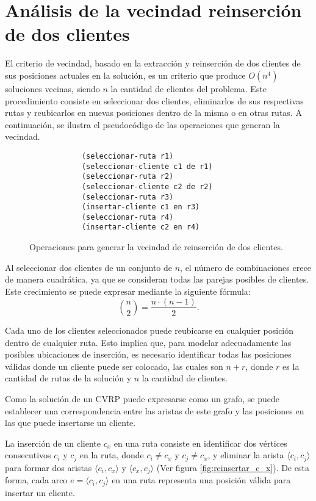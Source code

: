 \documentclass[12pt]{report}
\begin{document}
	\section{Análisis de la vecindad reinserción de dos clientes}
	\label{sec:Análisis de la vecindad reinserción de dos clientes}
	El criterio de vecindad, basado en la extracción y reinserción de dos clientes de sus posiciones actuales en la solución, es un criterio que produce $O(n^4)$ soluciones vecinas, siendo $n$ la cantidad de clientes del problema. Este procedimiento consiste en seleccionar dos clientes, eliminarlos de sus respectivas rutas y reubicarlos en nuevas posiciones dentro de la misma o en otras rutas. A continuación, se ilustra el pseudocódigo de las operaciones que generan la vecindad.
	\begin{figure}[h]
			\begin{verbatim}
			(seleccionar-ruta r1)
			(seleccionar-cliente c1 de r1)
			(seleccionar-ruta r2)
			(seleccionar-cliente c2 de r2)
			(seleccionar-ruta r3)
			(insertar-cliente c1 en r3)
			(seleccionar-ruta r4)
			(insertar-cliente c2 en r4)
		\end{verbatim}
		\caption{Operaciones para generar la vecindad de reinserción de dos clientes.}
		\label{fig:ejemplo_de_criterio}
	\end{figure}


	Al seleccionar dos clientes de un conjunto de $n$, el número de combinaciones crece de manera cuadrática, ya que se consideran todas las parejas posibles de clientes. Este crecimiento se puede expresar mediante la siguiente fórmula:
	\[
	\binom{n}{2} = \frac{n\cdot (n-1)}{2}\text{.}
	\]

	 Cada uno de los clientes seleccionados puede reubicarse en cualquier posición dentro de cualquier ruta. Esto implica que, para modelar adecuadamente las posibles ubicaciones de inserción, es necesario identificar todas las posiciones válidas donde un cliente puede ser colocado, las cuales son $n + r$, donde $r$ es la cantidad de rutas de la solución y $n$ la cantidad de clientes.

	Como la solución de un CVRP puede expresarse como un grafo, se puede establecer una correspondencia entre las aristas de este grafo y las posiciones en las que puede insertarse un cliente.


	La inserción de un cliente $c_x$ en una ruta consiste en identificar dos vértices consecutivos $c_i$ y $c_j$ en la ruta, donde $c_i \neq c_x$ y $c_j \neq c_x$, y eliminar la arista $\langle c_i,c_j \rangle$ para formar dos aristas $\langle c_i,c_x \rangle$ y $\langle c_x,c_j \rangle$ (Ver figura \ref{fig:reinsertar_c_x}). De esta forma, cada arco $e = \langle c_i,c_j \rangle$ en una ruta representa una posición válida para insertar un cliente.
\end{document}
